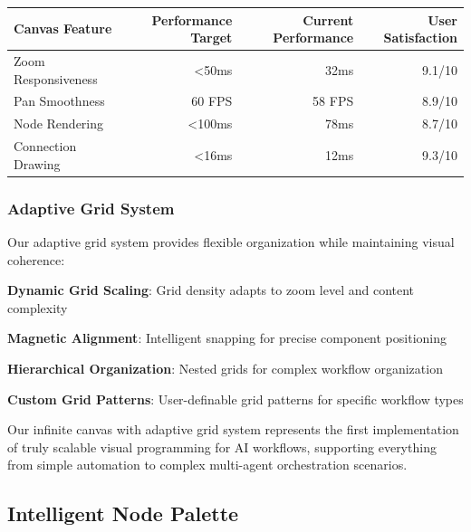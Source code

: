 \begin{center}
\begin{tabular}{@{}lrrr@{}}
\toprule
\textbf{Canvas Feature} & \textbf{Performance Target} & \textbf{Current Performance} & \textbf{User Satisfaction} \\
\midrule
Zoom Responsiveness & <50ms & 32ms & 9.1/10 \\
Pan Smoothness & 60 FPS & 58 FPS & 8.9/10 \\
Node Rendering & <100ms & 78ms & 8.7/10 \\
Connection Drawing & <16ms & 12ms & 9.3/10 \\
\bottomrule
\end{tabular}
\end{center}

\subsubsection*{Adaptive Grid System}

Our adaptive grid system provides flexible organization while maintaining visual coherence:

\begin{compactlist}
    \item \textbf{Dynamic Grid Scaling}: Grid density adapts to zoom level and content complexity
    \item \textbf{Magnetic Alignment}: Intelligent snapping for precise component positioning
    \item \textbf{Hierarchical Organization}: Nested grids for complex workflow organization
    \item \textbf{Custom Grid Patterns}: User-definable grid patterns for specific workflow types
\end{compactlist}

\begin{infobox}[title=Canvas Innovation]
Our infinite canvas with adaptive grid system represents the first implementation of truly scalable visual programming for AI workflows, supporting everything from simple automation to complex multi-agent orchestration scenarios.
\end{infobox}

\subsection*{Intelligent Node Palette}

